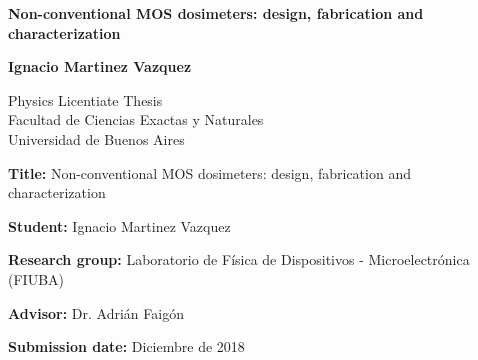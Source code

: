 \begin{titlepage}
   \begin{center}
\vspace*{1cm}

\Huge
\textbf{Non-conventional MOS dosimeters: design, fabrication and characterization}

\vspace{0.5cm}
 
\vspace{1.5cm}
 
\Large
\textbf{Ignacio Martinez Vazquez}

\vfill

Physics Licentiate Thesis\\
Facultad de Ciencias Exactas y Naturales\\
Universidad de Buenos Aires\\
 
       \vspace{0.8cm}
 
   \end{center}
\end{titlepage}
%
\textbf{Title:} Non-conventional MOS dosimeters: design, fabrication and characterization

\textbf{Student:} Ignacio Martinez Vazquez 

\textbf{Research group:} Laboratorio de Física de Dispositivos - Microelectrónica (FIUBA)

\textbf{Advisor:} Dr. Adrián Faigón

\textbf{Submission date:} Diciembre de 2018

\vfill
\newpage
